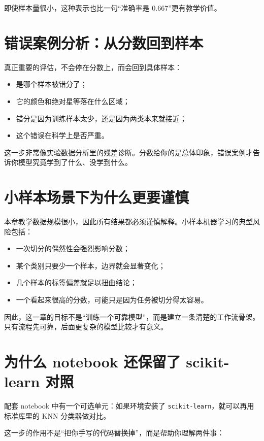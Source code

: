 即使样本量很小，这种表示也比一句“准确率是 0.667”更有教学价值。

\section{错误案例分析：从分数回到样本}

真正重要的评估，不会停在分数上，而会回到具体样本：

\begin{itemize}
    \item 是哪个样本被错分了；
    \item 它的颜色和绝对星等落在什么区域；
    \item 错分是因为训练样本太少，还是因为两类本来就接近；
    \item 这个错误在科学上是否严重。
\end{itemize}

这一步非常像实验数据分析里的残差诊断。分数给你的是总体印象，错误案例才告诉你模型究竟学到了什么、没学到什么。

\section{小样本场景下为什么更要谨慎}

本章教学数据规模很小，因此所有结果都必须谨慎解释。小样本机器学习的典型风险包括：

\begin{itemize}
    \item 一次切分的偶然性会强烈影响分数；
    \item 某个类别只要少一个样本，边界就会显著变化；
    \item 几个样本的标签偏差就足以扭曲结论；
    \item 一个看起来很高的分数，可能只是因为任务被切分得太容易。
\end{itemize}

因此，这一章的目标不是“训练一个可靠模型”，而是建立一条清楚的工作流骨架。只有流程先可靠，后面更复杂的模型比较才有意义。

\section{为什么 notebook 还保留了 scikit-learn 对照}

配套 notebook 中有一个可选单元：如果环境安装了 \texttt{scikit-learn}，就可以再用标准库里的 KNN 分类器做对比。

这一步的作用不是“把你手写的代码替换掉”，而是帮助你理解两件事：

